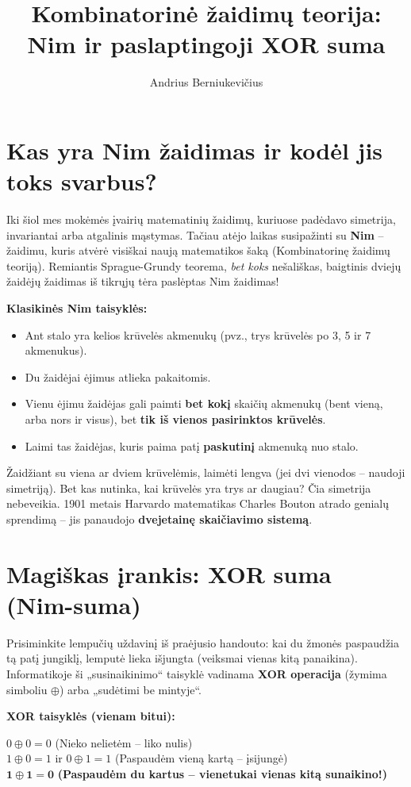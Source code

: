 \documentclass[11pt,a4paper]{scrartcl}
\title{Kombinatorinė žaidimų teorija: Nim ir paslaptingoji XOR suma}
\author{Andrius Berniukevičius}
\begin{document}
\maketitle

\section{Kas yra Nim žaidimas ir kodėl jis toks svarbus?}

Iki šiol mes mokėmės įvairių matematinių žaidimų, kuriuose padėdavo simetrija, invariantai arba atgalinis mąstymas. Tačiau atėjo laikas susipažinti su \textbf{Nim} – žaidimu, kuris atvėrė visiškai naują matematikos šaką (Kombinatorinę žaidimų teoriją). Remiantis Sprague-Grundy teorema, \textit{bet koks} nešališkas, baigtinis dviejų žaidėjų žaidimas iš tikrųjų tėra paslėptas Nim žaidimas!

\textbf{Klasikinės Nim taisyklės:}
\begin{itemize}
    \item Ant stalo yra kelios krūvelės akmenukų (pvz., trys krūvelės po 3, 5 ir 7 akmenukus).
    \item Du žaidėjai ėjimus atlieka pakaitomis.
    \item Vienu ėjimu žaidėjas gali paimti \textbf{bet kokį} skaičių akmenukų (bent vieną, arba nors ir visus), bet \textbf{tik iš vienos pasirinktos krūvelės}.
    \item Laimi tas žaidėjas, kuris paima patį \textbf{paskutinį} akmenuką nuo stalo.
\end{itemize}

Žaidžiant su viena ar dviem krūvelėmis, laimėti lengva (jei dvi vienodos – naudoji simetriją). Bet kas nutinka, kai krūvelės yra trys ar daugiau? Čia simetrija nebeveikia. 1901 metais Harvardo matematikas Charles Bouton atrado genialų sprendimą – jis panaudojo \textbf{dvejetainę skaičiavimo sistemą}.

\section{Magiškas įrankis: XOR suma (Nim-suma)}

Prisiminkite lempučių uždavinį iš praėjusio handouto: kai du žmonės paspaudžia tą patį jungiklį, lemputė lieka išjungta (veiksmai vienas kitą panaikina). Informatikoje ši „susinaikinimo“ taisyklė vadinama \textbf{XOR operacija} (žymima simboliu $\oplus$) arba „sudėtimi be mintyje“.

\textbf{XOR taisyklės (vienam bitui):}
\begin{center}
$0 \oplus 0 = 0$ \quad (Nieko nelietėm – liko nulis)\\
$1 \oplus 0 = 1$ ir $0 \oplus 1 = 1$ \quad (Paspaudėm vieną kartą – įsijungė)\\
$\mathbf{1 \oplus 1 = 0}$ \quad \textbf{(Paspaudėm du kartus – vienetukai vienas kitą sunaikino!)}
\end{center}
\end{document}
